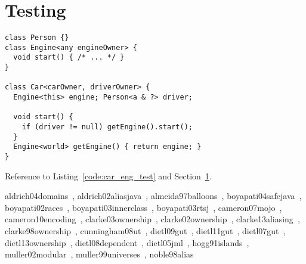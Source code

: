 \documentclass{acm_proc_article-sp}
\begin{document}
\lipsum[8]








\section{Testing}
\label{sec:test}

\begin{lstlisting}[caption={Car Engine Example},label=code:car_eng_test]
class Person {}
class Engine<any engineOwner> {
  void start() { /* ... */ }
}

class Car<carOwner, driverOwner> {
  Engine<this> engine; Person<a & ?> driver;
    
  void start() {
    if (driver != null) getEngine().start();
  }
  Engine<world> getEngine() { return engine; }
}
\end{lstlisting}

Reference to Listing~\ref{code:car_eng_test} and Section~\ref{sec:test}.

aldrich04domains~\cite{aldrich04domains},\newline
aldrich02aliasjava~\cite{aldrich02aliasjava},\newline
almeida97balloons~\cite{almeida97balloons},\newline
boyapati04safejava~\cite{boyapati04safejava},\newline
boyapati02races~\cite{boyapati02races},\newline
boyapati03innerclass~\cite{boyapati03innerclass},\newline
boyapati03rtsj~\cite{boyapati03rtsj},\newline
cameron07mojo~\cite{cameron07mojo},\newline
cameron10encoding~\cite{cameron10encoding},\newline
clarke03ownership~\cite{clarke03ownership},\newline
clarke02ownership~\cite{clarke02ownership},\newline
clarke13aliasing~\cite{clarke13aliasing},\newline
clarke98ownership~\cite{clarke98ownership},\newline
cunningham08ut~\cite{cunningham08ut},\newline
dietl09gut~\cite{dietl09gut},\newline
dietl11gut~\cite{dietl11gut},\newline
dietl07gut~\cite{dietl07gut},\newline
dietl13ownership~\cite{dietl13ownership},\newline
dietl08dependent~\cite{dietl08dependent},\newline
dietl05jml~\cite{dietl05jml},\newline
hogg91islands~\cite{hogg91islands},\newline
muller02modular~\cite{muller02modular},\newline
muller99universes~\cite{muller99universes},\newline
noble98alias~\cite{noble98alias}





\end{document}
